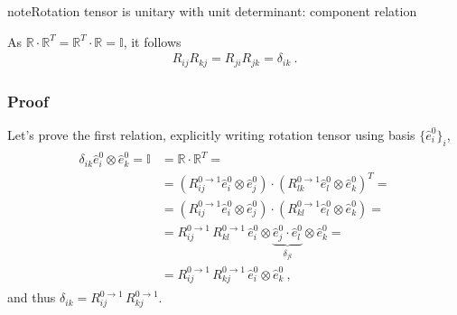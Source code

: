 \documentclass[letterpaper,10pt,english]{jupyterBook}
\begin{document}
\begin{sphinxadmonition}{note}{Rotation tensor is unitary with unit determinant: component relation}

\sphinxAtStartPar
As \(\mathbb{R} \cdot \mathbb{R}^T = \mathbb{R}^T \cdot  \mathbb{R} =  \mathbb{I}\), it follows
\begin{equation*}
\begin{split}R_{ij} R_{kj} = R_{ji} R_{jk} = \delta_{ik} \ .\end{split}
\end{equation*}\subsubsection*{Proof}

\sphinxAtStartPar
Let’s prove the first relation, explicitly writing rotation tensor using basis \(\{ \hat{e}^0_i \}_i\),
\begin{equation*}
\begin{split}\begin{aligned}
  \delta_{ik} \hat{e}^0_i \otimes \hat{e}^0_k = \mathbb{I} 
  & = \mathbb{R} \cdot \mathbb{R}^T = \\
  & = \left( R_{ij}^{0 \rightarrow 1} \hat{e}^0_i \otimes \hat{e}^0_j  \right) \cdot \left( R_{lk}^{0 \rightarrow 1} \hat{e}^0_l \otimes \hat{e}^0_k \right)^T = \\
  & = \left( R_{ij}^{0 \rightarrow 1} \hat{e}^0_i \otimes \hat{e}^0_j  \right) \cdot \left( R_{kl}^{0 \rightarrow 1} \hat{e}^0_l \otimes \hat{e}^0_k \right) = \\
  & = R_{ij}^{0 \rightarrow 1} \, R_{kl}^{0 \rightarrow 1} \, \hat{e}^0_i \otimes \underbrace{\hat{e}^0_j  \cdot  \hat{e}^0_l}_{\delta_{jl}} \otimes \hat{e}^0_k  = \\
  & = R_{ij}^{0 \rightarrow 1} \, R_{kj}^{0 \rightarrow 1} \, \hat{e}^0_i \otimes \hat{e}^0_k \ ,
\end{aligned}\end{split}
\end{equation*}
\sphinxAtStartPar
and thus \(\delta_{ik} = R_{ij}^{0 \rightarrow 1} \, R_{kj}^{0 \rightarrow 1} \).

\sphinxAtStartPar
{} 
\end{sphinxadmonition}
\end{document}
